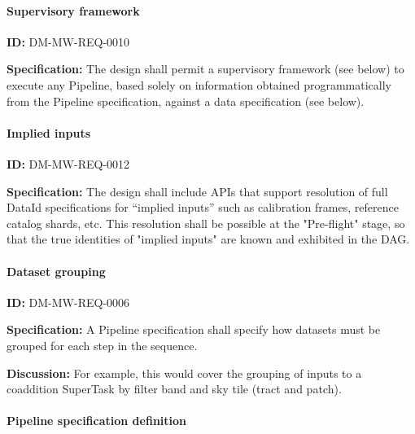 \documentclass[SE,toc,lsstdraft]{lsstdoc}
\begin{document}
\paragraph{Supervisory framework}\hfill  %

\label{DM-MW-REQ-0010}
\textbf{ID:} DM-MW-REQ-0010

\textbf{Specification:}
The design shall permit a supervisory framework (see below) to execute any Pipeline, based solely on information obtained programmatically from the Pipeline specification, against a data specification (see below).





\paragraph{Implied inputs}\hfill  %

\label{DM-MW-REQ-0012}
\textbf{ID:} DM-MW-REQ-0012

\textbf{Specification:}
The design shall include APIs that support resolution of full DataId specifications for “implied inputs” such as calibration frames, reference catalog shards, etc. This resolution shall be possible at the "Pre-flight" stage, so that the true identities of "implied inputs" are known and exhibited in the DAG.





\paragraph{Dataset grouping}\hfill  %

\label{DM-MW-REQ-0006}
\textbf{ID:} DM-MW-REQ-0006

\textbf{Specification:}
A Pipeline specification shall specify how datasets must be grouped for each step in the sequence.

\textbf{Discussion:}
For example, this would cover the grouping of inputs to a coaddition SuperTask by filter band and sky tile (tract and patch).




\paragraph{Pipeline specification definition}\hfill  %
\end{document}
